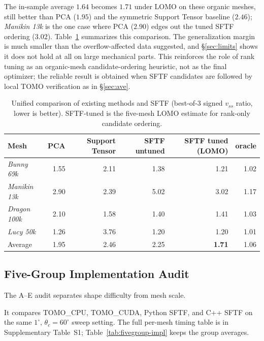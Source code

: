 \documentclass[11pt,a4paper]{article}
\begin{document}
The in-sample average $1.64$ becomes $1.71$ under LOMO on these organic meshes, still better than PCA ($1.95$) and the symmetric Support Tensor baseline ($2.46$); \emph{Manikin 13k} is the one case where PCA ($2.90$) edges out the tuned SFTF ordering ($3.02$). Table~\ref{tab:unified} summarizes this comparison. The generalization margin is much smaller than the overflow-affected data suggested, and \S\ref{sec:limits} shows it does not hold at all on large mechanical parts. This reinforces the role of rank tuning as an organic-mesh candidate-ordering heuristic, not as the final optimizer; the reliable result is obtained when SFTF candidates are followed by local TOMO verification as in \S\ref{sec:ave}.

\begin{table}[H]
\centering
\caption{Unified comparison of existing methods and SFTF (best-of-3 signed $v_{ss}$ ratio, lower is better).
SFTF-tuned is the five-mesh LOMO estimate for rank-only candidate ordering.}
\label{tab:unified}
\begin{tabular}{lrrrrr}
\toprule
Mesh & PCA & Support Tensor & SFTF untuned & SFTF tuned (LOMO) & oracle\\
\midrule
\emph{Bunny 69k}    & 1.55 & 2.11 & 1.38 & 1.21 & 1.02\\
\emph{Manikin 13k}  & 2.90 & 2.39 & 5.02 & 3.02 & 1.17\\
\emph{Dragon 100k}   & 2.10 & 1.58 & 1.40 & 1.41 & 1.03\\
\emph{Lucy 50k}     & 1.26 & 3.76 & 1.20 & 1.20 & 1.01\\
\midrule
Average     & 1.95 & 2.46 & 2.25 & \textbf{1.71} & 1.06\\
\bottomrule
\end{tabular}
\end{table}

\subsection{Five-Group Implementation Audit}
\label{sec:fivegroup}
\label{sec:impl-compare}
\label{sec:groupE}
\label{sec:critangle}
\label{sec:kray-discussion}

The A--E audit separates shape difficulty from mesh scale.

It compares TOMO\_CPU, TOMO\_CUDA, Python SFTF, and C++ SFTF on the same $1^\circ$, $\theta_c=60^\circ$ sweep setting. The full per-mesh timing table is in Supplementary Table~S1; Table~\ref{tab:fivegroup-impl} keeps the group averages.
\end{document}
